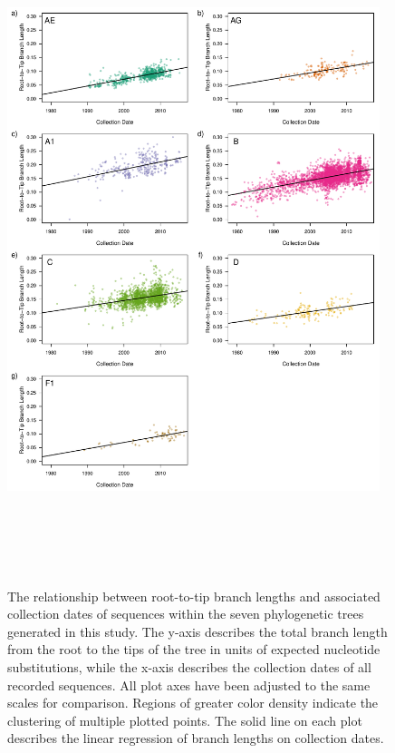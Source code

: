 \documentclass[12pt]{article}
\begin{document}
\begin{figure}
    \includegraphics[height=195mm, width=0.97\textwidth]{branch-lengths}
    \caption{%
    The relationship between root-to-tip branch lengths and associated collection dates of sequences within the seven phylogenetic trees generated in this study. 
    The y-axis describes the total branch length from the root to the tips of the tree in units of expected nucleotide substitutions, while the x-axis describes the collection dates of all recorded sequences. 
    All plot axes have been adjusted to the same scales for comparison. 
    Regions of greater color density indicate the clustering of multiple plotted points.  
    The solid line on each plot describes the linear regression of branch lengths on collection dates. 
    }
	\centering
   
    \label{branch-lengths}
\end{figure}
\end{document}
